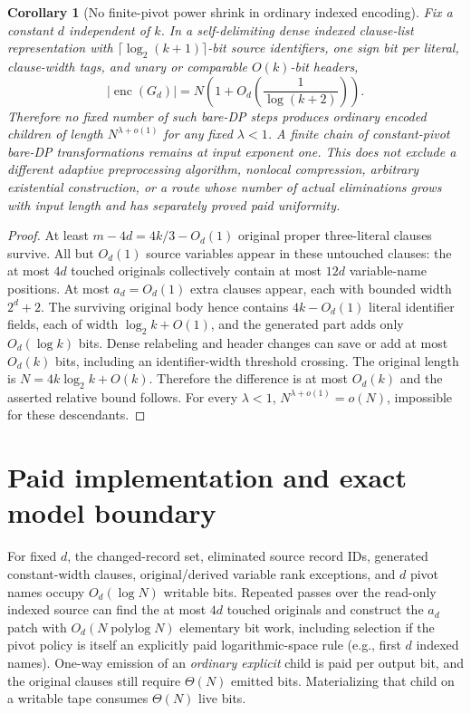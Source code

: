 \documentclass[11pt]{article}
\newtheorem{corollary}[theorem]{Corollary}
\begin{document}
\begin{corollary}[No finite-pivot power shrink in ordinary indexed encoding]
Fix a constant $d$ independent of $k$. In a self-delimiting dense indexed clause-list representation with $\lceil\log_2(k+1)\rceil$-bit source identifiers, one sign bit per literal, clause-width tags, and unary or comparable $O(k)$-bit headers,
\[
\boxed{\ |\operatorname{enc}(G_d)|=N\left(1+O_d\left(\frac1{\log(k+2)}\right)\right).\ }
\]
Therefore no fixed number of such bare-DP steps produces ordinary encoded children of length $N^{\lambda+o(1)}$ for any fixed $\lambda<1$. A finite chain of constant-pivot bare-DP transformations remains at input exponent one. This does \emph{not} exclude a different adaptive preprocessing algorithm, nonlocal compression, arbitrary existential construction, or a route whose number of actual eliminations grows with input length and has separately proved paid uniformity.
\end{corollary}
\begin{proof}
At least $m-4d=4k/3-O_d(1)$ original proper three-literal clauses survive. All but $O_d(1)$ source variables appear in these untouched clauses: the at most $4d$ touched originals collectively contain at most $12d$ variable-name positions. At most $a_d=O_d(1)$ extra clauses appear, each with bounded width $2^d+2$. The surviving original body hence contains $4k-O_d(1)$ literal identifier fields, each of width $\log_2k+O(1)$, and the generated part adds only $O_d(\log k)$ bits. Dense relabeling and header changes can save or add at most $O_d(k)$ bits, including an identifier-width threshold crossing. The original length is $N=4k\log_2k+O(k)$. Therefore the difference is at most $O_d(k)$ and the asserted relative bound follows. For every $\lambda<1$, $N^{\lambda+o(1)}=o(N)$, impossible for these descendants.\end{proof}

\section{Paid implementation and exact model boundary}
For fixed $d$, the changed-record set, eliminated source record IDs, generated constant-width clauses, original/derived variable rank exceptions, and $d$ pivot names occupy $O_d(\log N)$ writable bits. Repeated passes over the read-only indexed source can find the at most $4d$ touched originals and construct the $a_d$ patch with $O_d(N\operatorname{polylog}N)$ elementary bit work, including selection if the pivot policy is itself an explicitly paid logarithmic-space rule (e.g., first $d$ indexed names). One-way emission of an \emph{ordinary explicit} child is paid per output bit, and the original clauses still require $\Theta(N)$ emitted bits. Materializing that child on a writable tape consumes $\Theta(N)$ live bits.
\end{document}
